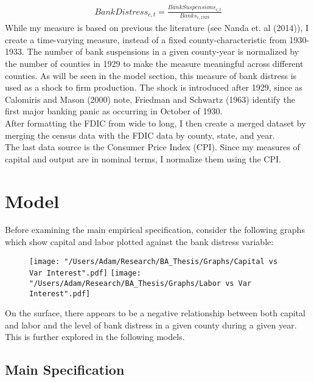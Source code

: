 \documentclass[letter,11pt]{article}
\begin{document}
{\begin{align*}
BankDistress_{c, t} = \frac{BankSuspensions_{c, t}} {Banks_{c, 1929}}
\end{align*}
While my measure is based on previous the literature (see Nanda et. al (2014)), I create a time-varying measure, instead of a fixed county-characteristic from 1930-1933. The number of bank suspensions in a given county-year is normalized by the number of counties in 1929 to make the measure meaningful across different counties. As will be seen in the model section, this measure of bank distress is used as a shock to firm production. The shock is introduced after 1929, since as Calomiris and Mason (2000) note, Friedman and Schwartz (1963) identify the first major banking panic as occurring in October of 1930.  
\\
\indent After formatting the FDIC from wide to long, I then create a merged dataset by merging the census data with the FDIC data by county, state, and year. 
\\
\indent The last data source is the Consumer Price Index (CPI). Since my measures of capital and output are in nominal terms, I normalize them using the CPI. 

\section{Model}


\indent Before examining the main empirical specification, consider the following graphs which show capital and labor plotted against the bank distress variable: 
\begin{figure}[!htb]
  \texttt{[image: "/Users/Adam/Research/BA\_Thesis/Graphs/Capital vs Var Interest".pdf]}
\endminipage\hfill
{}
  \texttt{[image: "/Users/Adam/Research/BA\_Thesis/Graphs/Labor vs Var Interest".pdf]}
\endminipage
\end{figure}

On the surface, there appears to be a negative relationship between both capital and labor and the level of bank distress in a given county during a given year. This is further explored in the following models.


\subsection{Main Specification}

}
\end{document}
